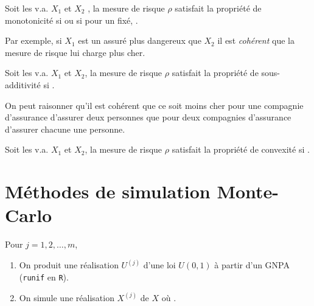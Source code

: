 \documentclass[10pt, french]{article}
\begin{document}
\begin{multicols*}{2}
\begin{definitionNOHFILLsub}[Monotonicité]
Soit les v.a. $X_{1}$ et $X_{2}$ , la mesure de risque $\rho$ satisfait la propriété de monotonicité si  ou si pour un  fixé, .\\

\begin{rappel_enhanced}[Interprétation]
Par exemple, si $X_{1}$ est un assuré plus dangereux que $X_{2}$ il est \textit{cohérent} que la mesure de risque lui charge plus cher.
\end{rappel_enhanced}
\end{definitionNOHFILLsub}

\begin{definitionNOHFILLsub}
Soit les v.a. $X_{1}$ et $X_{2}$, la mesure de risque $\rho$ satisfait la propriété de sous-additivité si .\\

\begin{rappel_enhanced}[Interprétation]
On peut raisonner qu'il est cohérent que ce soit moins cher pour une compagnie d'assurance d’assurer deux personnes que pour deux compagnies d'assurance d’assurer chacune une personne.
\end{rappel_enhanced}
\end{definitionNOHFILLsub}

\begin{definitionNOHFILLsub}[Convexité]
Soit les v.a. $X_{1}$ et $X_{2}$, la mesure de risque $\rho$ satisfait la propriété de convexité si .
\end{definitionNOHFILLsub}



\pagebreak
\section{Méthodes de simulation Monte-Carlo}
\begin{algo2}
Pour $j	=	1, 2, \dots, m$, 
\begin{enumerate}
	\item	On produit une réalisation $U^{(j)}$ d'une loi $U(0, 1)$ à partir d'un GNPA (\texttt{runif} en \texttt{R}).
	\item	On simule une réalisation $X^{(j)}$ de $X$ où .
\end{enumerate}
\end{algo2}


\end{multicols*}
\end{document}
